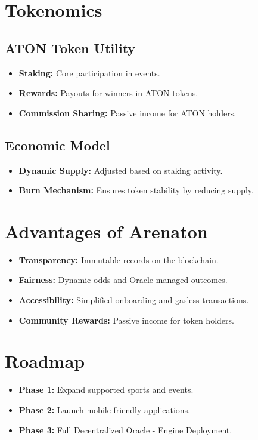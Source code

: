 \documentclass[11pt,twocolumn]{article}
\begin{document}
\section{Tokenomics}
\subsection{ATON Token Utility}
\begin{itemize}[itemsep=0.5em]
    \item \textbf{Staking:} Core participation in events.
    \item \textbf{Rewards:} Payouts for winners in ATON tokens.
    \item \textbf{Commission Sharing:} Passive income for ATON holders.
\end{itemize}

\subsection{Economic Model}
\begin{itemize}[itemsep=0.5em]
    \item \textbf{Dynamic Supply:} Adjusted based on staking activity.
    \item \textbf{Burn Mechanism:} Ensures token stability by reducing supply.
\end{itemize}

\section{Advantages of Arenaton}
\begin{itemize}[itemsep=0.5em]
    \item \textbf{Transparency:} Immutable records on the blockchain.
    \item \textbf{Fairness:} Dynamic odds and Oracle-managed outcomes.
    \item \textbf{Accessibility:} Simplified onboarding and gasless transactions.
    \item \textbf{Community Rewards:} Passive income for token holders.
\end{itemize}

\section{Roadmap}
\begin{itemize}[itemsep=0.5em]
    \item \textbf{Phase 1:} Expand supported sports and events.
    \item \textbf{Phase 2:} Launch mobile-friendly applications.
    \item \textbf{Phase 3:} Full Decentralized Oracle - Engine Deployment.
\end{itemize}
\end{document}
